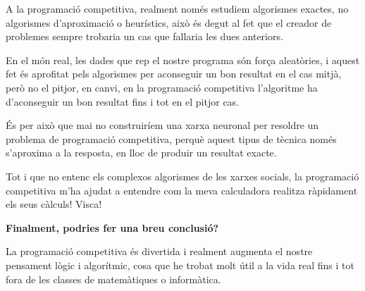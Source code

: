 A la programació competitiva, realment només estudiem algorismes exactes, no algorismes d'aproximació o heurístics, això és degut al fet que el creador de problemes sempre trobaria un cas que fallaria les dues anteriors.

En el món real, les dades que rep el nostre programa són força aleatòries, i aquest fet és aprofitat pels algorismes per aconseguir un bon resultat en el cas mitjà, però no el pitjor, en canvi, en la programació competitiva l'algoritme ha d'aconseguir un bon resultat fins i tot en el pitjor cas.

És per això que mai no construiríem una xarxa neuronal per resoldre un problema de programació competitiva, perquè aquest tipus de tècnica només s'aproxima a la resposta, en lloc de produir un resultat exacte.

Tot i que no entenc els complexos algorismes de les xarxes socials, la programació competitiva m'ha ajudat a entendre com la meva calculadora realitza ràpidament els seus càlculs! Visca!
\newline

\textbf{Finalment, podries fer una breu conclusió?}
\newline

La programació competitiva és divertida i realment augmenta el nostre pensament lògic i algorítmic, cosa que he trobat molt útil a la vida real fins i tot fora de les classes de matemàtiques o informàtica.

